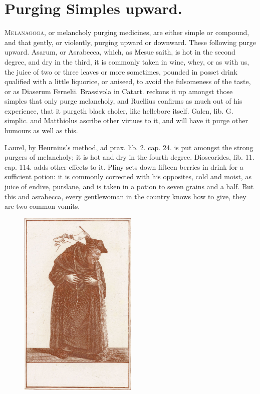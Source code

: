 {\section{Purging Simples upward.}
\lettrine{M}{elanagoga}, or melancholy purging medicines, are either simple or
compound, and that gently, or violently, purging upward or downward.
These following purge upward. Asarum, or Asrabecca, which, as
Mesue saith, is hot in the second degree, and dry in the third, it is
commonly taken in wine, whey, or as with us, the juice of two or three
leaves or more sometimes, pounded in posset drink qualified with a
little liquorice, or aniseed, to avoid the fulsomeness of the taste, or
as Diaserum Fernelii. Brassivola in Catart. reckons it up amongst those
simples that only purge melancholy, and Ruellius confirms as much out
of his experience, that it purgeth black choler, like hellebore
itself. Galen, lib. G. simplic. and Matthiolus ascribe other
virtues to it, and will have it purge other humours as well as this.

Laurel, by Heurnius's method, ad prax. lib. 2. cap. 24. is put amongst
the strong purgers of melancholy; it is hot and dry in the fourth
degree. Dioscorides, lib. 11. cap. 114. adds other effects to it.
Pliny sets down fifteen berries in drink for a sufficient potion:
it is commonly corrected with his opposites, cold and moist, as juice
of endive, purslane, and is taken in a potion to seven grains and a
half. But this and asrabecca, every gentlewoman in the country knows
how to give, they are two common vomits.

\begin{figure}[tbh]
  \begingroup
  \centering
  \includegraphics[keepaspectratio,width=0.5\textwidth]{figures/Vomiting-monk-Jacob-Gole-small.jpg}
  \label{fig:vomitingmonk}
\end{figure}

}
